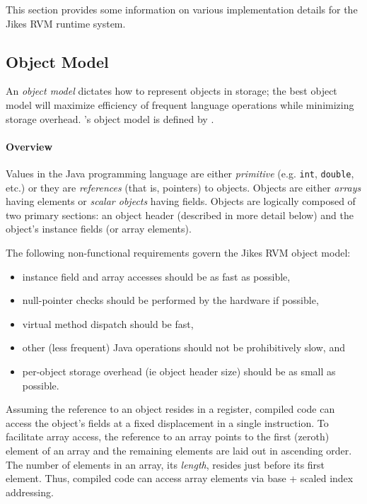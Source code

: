 This section provides some information on various
implementation details for the Jikes\TMweb{} RVM runtime system.


\subsection{Object Model} \label{sssec:objects}
An {\em object model} dictates how to represent objects in storage;
the best object model will maximize efficiency of frequent language
operations while minimizing storage overhead. \jrvm's
object model 
is defined by .

\paragraph{Overview}
Values in the Java\TMweb{} programming language are either {\em
primitive} (e.g. {\tt int}, {\tt double}, etc.)  or they are {\em
references} (that is, pointers) to objects.  Objects are either {\em
arrays} having elements or {\em scalar objects} having fields.
Objects are logically composed of two primary sections: an object
header (described in more detail below) and the object's instance
fields (or array elements). 

The following non-functional requirements govern the Jikes RVM object model:
\begin{itemize}
\item
instance field and array accesses should be as fast as possible,
\item
null-pointer checks should be performed by the hardware if possible, 
\item
virtual method dispatch should be fast,
\item
other (less frequent) Java operations should not be prohibitively
slow, and
\item
per-object storage overhead (ie object header size) should be as small
as possible.
\end{itemize}

Assuming the reference to an object resides in a register, compiled code can 
access the object's fields at a fixed displacement in a single
instruction.  To facilitate array access, the reference to an array
points to the first (zeroth) element of an array and the remaining
elements are laid out in ascending order.  The number of elements in
an array, its {\em length}, resides just before its first
element. Thus, compiled code can access array elements via base +
scaled index addressing.

